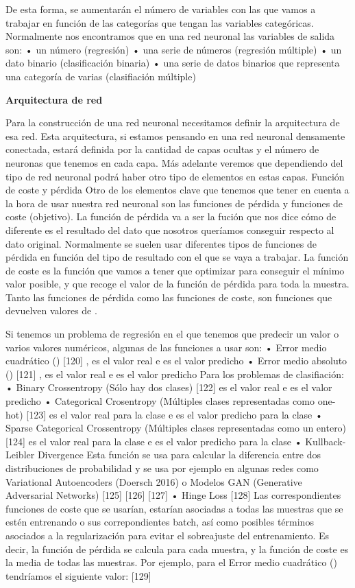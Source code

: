 \documentclass[
  a4paper,
  DIV=11,
  numbers=noendperiod]{scrreprt}
\begin{document}
De esta forma, se aumentarán el número de variables con las que vamos a
trabajar en función de las categorías que tengan las variables
categóricas. Normalmente nos encontramos que en una red neuronal las
variables de salida son: • un número (regresión) • una serie de números
(regresión múltiple) • un dato binario (clasificación binaria) • una
serie de datos binarios que representa una categoría de varias
(clasifiación múltiple)

\textbf{Arquitectura de red}

Para la construcción de una red neuronal necesitamos definir la
arquitectura de esa red. Esta arquitectura, si estamos pensando en una
red neuronal densamente conectada, estará definida por la cantidad de
capas ocultas y el número de neuronas que tenemos en cada capa. Más
adelante veremos que dependiendo del tipo de red neuronal podrá haber
otro tipo de elementos en estas capas. Función de coste y pérdida Otro
de los elementos clave que tenemos que tener en cuenta a la hora de usar
nuestra red neuronal son las funciones de pérdida y funciones de coste
(objetivo). La función de pérdida va a ser la fución que nos dice cómo
de diferente es el resultado del dato que nosotros queríamos conseguir
respecto al dato original. Normalmente se suelen usar diferentes tipos
de funciones de pérdida en función del tipo de resultado con el que se
vaya a trabajar. La función de coste es la función que vamos a tener que
optimizar para conseguir el mínimo valor posible, y que recoge el valor
de la función de pérdida para toda la muestra. Tanto las funciones de
pérdida como las funciones de coste, son funciones que devuelven valores
de .

Si tenemos un problema de regresión en el que tenemos que predecir un
valor o varios valores numéricos, algunas de las funciones a usar son: •
Error medio cuadrático () {[}120{]} , es el valor real e es el valor
predicho • Error medio absoluto () {[}121{]} , es el valor real e es el
valor predicho Para los problemas de clasifiación: • Binary Crossentropy
(Sólo hay dos clases) {[}122{]} es el valor real e es el valor predicho
• Categorical Crosentropy (Múltiples clases representadas como one-hot)
{[}123{]} es el valor real para la clase e es el valor predicho para la
clase • Sparse Categorical Crossentropy (Múltiples clases representadas
como un entero) {[}124{]} es el valor real para la clase e es el valor
predicho para la clase • Kullback-Leibler Divergence Esta función se usa
para calcular la diferencia entre dos distribuciones de probabilidad y
se usa por ejemplo en algunas redes como Variational Autoencoders
(Doersch 2016) o Modelos GAN (Generative Adversarial Networks) {[}125{]}
{[}126{]} {[}127{]} • Hinge Loss {[}128{]} Las correspondientes
funciones de coste que se usarían, estarían asociadas a todas las
muestras que se estén entrenando o sus correpondientes batch, así como
posibles términos asociados a la regularización para evitar el
sobreajuste del entrenamiento. Es decir, la función de pérdida se
calcula para cada muestra, y la función de coste es la media de todas
las muestras. Por ejemplo, para el Error medio cuadrático () tendríamos
el siguiente valor: {[}129{]}
\end{document}
